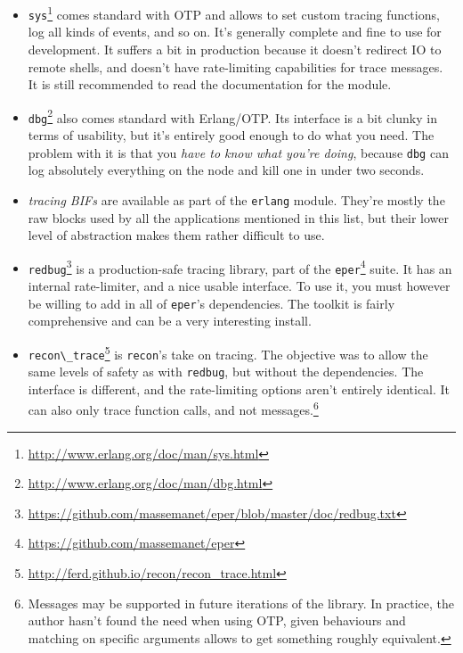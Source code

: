 \documentclass[11pt, oneside]{book}   	%
\newcommand{\otpapp}[1]{\Verb`#1`}
\newcommand{\module}[1]{\Verb`#1`}
\begin{document}
\begin{itemize}
	\item \module{sys}\footnote{\href{http://www.erlang.org/doc/man/sys.html}{http://www.erlang.org/doc/man/sys.html}} comes standard with OTP and allows to set custom tracing functions, log all kinds of events, and so on. It's generally complete and fine to use for development. It suffers a bit in production because it doesn't redirect IO to remote shells, and doesn't have rate-limiting capabilities for trace messages. It is still recommended to read the documentation for the module.
	
	\item \otpapp{dbg}\footnote{\href{http://www.erlang.org/doc/man/dbg.html}{http://www.erlang.org/doc/man/dbg.html}} also comes standard with Erlang/OTP. Its interface is a bit clunky in terms of usability, but it's entirely good enough to do what you need. The problem with it is that you \emph{have to know what you're doing}, because \otpapp{dbg} can log absolutely everything on the node and kill one in under two seconds.
	
	\item \emph{tracing BIFs} are available as part of the \module{erlang} module. They're mostly the raw blocks used by all the applications mentioned in this list, but their lower level of abstraction makes them rather difficult to use.
	
	\item \otpapp{redbug}\footnote{\href{https://github.com/massemanet/eper/blob/master/doc/redbug.txt}{https://github.com/massemanet/eper/blob/master/doc/redbug.txt}} is a production-safe tracing library, part of the \otpapp{eper}\footnote{\href{https://github.com/massemanet/eper}{https://github.com/massemanet/eper}} suite. It has an internal rate-limiter, and a nice usable interface. To use it, you must however be willing to add in all of \otpapp{eper}'s dependencies. The toolkit is fairly comprehensive and can be a very interesting install.
	
	\item \module{recon\_trace}\footnote{\href{http://ferd.github.io/recon/recon\_trace.html}{http://ferd.github.io/recon/recon\_trace.html}} is \otpapp{recon}'s take on tracing. The objective was to allow the same levels of safety as with \otpapp{redbug}, but without the dependencies. The interface is different, and the rate-limiting options aren't entirely identical. It can also only trace function calls, and not messages.\footnote{Messages may be supported in future iterations of the library. In practice, the author hasn't found the need when using OTP, given behaviours and matching on specific arguments allows to get something roughly equivalent.}
\end{itemize}
\end{document}
